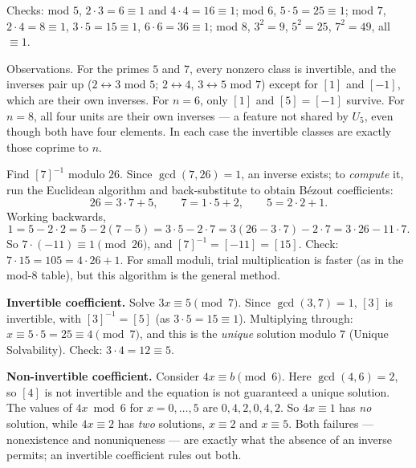 \documentclass[11pt]{report}
\begin{document}
\begin{exbox}
Checks: mod $5$, $2 \cdot 3 = 6 \equiv 1$ and $4 \cdot 4 = 16 \equiv 1$; mod $6$, $5 \cdot 5 = 25 \equiv 1$; mod $7$, $2 \cdot 4 = 8 \equiv 1$, $3 \cdot 5 = 15 \equiv 1$, $6 \cdot 6 = 36 \equiv 1$; mod $8$, $3^2 = 9$, $5^2 = 25$, $7^2 = 49$, all $\equiv 1$.

Observations. For the primes $5$ and $7$, every nonzero class is invertible, and the inverses pair up ($2 \leftrightarrow 3$ mod $5$; $2 \leftrightarrow 4$, $3 \leftrightarrow 5$ mod $7$) except for $[1]$ and $[-1]$, which are their own inverses. For $n = 6$, only $[1]$ and $[5] = [-1]$ survive. For $n = 8$, all four units are their own inverses --- a feature not shared by $U_5$, even though both have four elements. In each case the invertible classes are exactly those coprime to $n$.
\end{exbox}

\begin{exbox}\label{ex:computing-inverse-extended-euclidean-algorithm}
Find $[7]^{-1}$ modulo $26$. Since $\gcd(7, 26) = 1$, an inverse exists; to \emph{compute} it, run the Euclidean algorithm and back-substitute to obtain B\'ezout coefficients:
\[ 26 = 3 \cdot 7 + 5, \qquad 7 = 1 \cdot 5 + 2, \qquad 5 = 2 \cdot 2 + 1. \]
Working backwards,
\[ 1 = 5 - 2 \cdot 2 = 5 - 2(7 - 5) = 3 \cdot 5 - 2 \cdot 7 = 3(26 - 3 \cdot 7) - 2 \cdot 7 = 3 \cdot 26 - 11 \cdot 7. \]
So $7 \cdot (-11) \equiv 1 \pmod{26}$, and $[7]^{-1} = [-11] = [15]$. Check: $7 \cdot 15 = 105 = 4 \cdot 26 + 1$. For small moduli, trial multiplication is faster (as in the mod-$8$ table), but this algorithm is the general method.
\end{exbox}

\begin{exbox}\label{ex:solving-linear-congruences}
\textbf{Invertible coefficient.} Solve $3x \equiv 5 \pmod 7$. Since $\gcd(3, 7) = 1$, $[3]$ is invertible, with $[3]^{-1} = [5]$ (as $3 \cdot 5 = 15 \equiv 1$). Multiplying through: $x \equiv 5 \cdot 5 = 25 \equiv 4 \pmod 7$, and this is the \emph{unique} solution modulo $7$ (Unique Solvability). Check: $3 \cdot 4 = 12 \equiv 5$.

\textbf{Non-invertible coefficient.} Consider $4x \equiv b \pmod 6$. Here $\gcd(4, 6) = 2$, so $[4]$ is not invertible and the equation is not guaranteed a unique solution. The values of $4x \bmod 6$ for $x = 0, \ldots, 5$ are $0, 4, 2, 0, 4, 2$. So $4x \equiv 1$ has \emph{no} solution, while $4x \equiv 2$ has \emph{two} solutions, $x \equiv 2$ and $x \equiv 5$. Both failures --- nonexistence and nonuniqueness --- are exactly what the absence of an inverse permits; an invertible coefficient rules out both.
\end{exbox}
\end{document}

